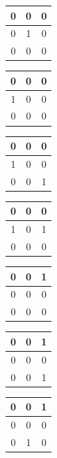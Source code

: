 \begin{center}
\begin{tabular}{|c|c|c|}
     \hline
     0&0&0\\\hline
     0&1&0\\\hline
     0&0&0\\\hline
\end{tabular}\hspace{0.3cm}
\begin{tabular}{|c|c|c|}
     \hline
     0&0&0\\\hline
     1&0&0\\\hline
     0&0&0\\\hline
\end{tabular}\hspace{0.3cm}
\begin{tabular}{|c|c|c|}
     \hline
     0&0&0\\\hline
     1&0&0\\\hline
     0&0&1\\\hline
\end{tabular}\hspace{0.3cm}
\begin{tabular}{|c|c|c|}
     \hline
     0&0&0\\\hline
     1&0&1\\\hline
     0&0&0\\\hline
\end{tabular}\hspace{0.3cm}
\begin{tabular}{|c|c|c|}
     \hline
     0&0&1\\\hline
     0&0&0\\\hline
     0&0&0\\\hline
\end{tabular}\hspace{0.3cm}
\begin{tabular}{|c|c|c|}
     \hline
     0&0&1\\\hline
     0&0&0\\\hline
     0&0&1\\\hline
\end{tabular}\hspace{0.3cm}
\begin{tabular}{|c|c|c|}
     \hline
     0&0&1\\\hline
     0&0&0\\\hline
     0&1&0\\\hline
\end{tabular}\\\vspace{0.3cm}
\begin{tabular}{|c|c|c|}

\end{tabular}
\end{center}
